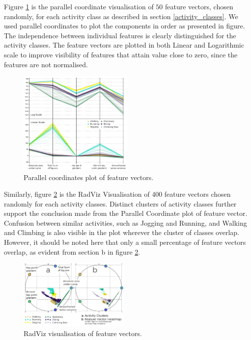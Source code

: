 \documentclass[5p]{elsarticle}
\begin{document}
Figure \ref{parallel_plot} is the parallel coordinate visualisation \cite{Wegman1990} of $50$ feature vectors, chosen randomly, for each activity class as described in section \ref{activity_classes}. We used parallel coordinates to plot the components in order as presented in figure. The independence between individual features is clearly distinguished for the activity classes. The feature vectors are plotted in both Linear and Logarithmic scale to improve visibility of features that attain value close to zero, since the features are not normalised.

\begin{figure}[h!]
  \begin{center}
    \includegraphics[width=0.5\textwidth]{ParallelPlot}
  \end{center}
  \vspace{-10pt}
  \caption{\label{parallel_plot}Parallel coordinates plot of feature vectors.}
  \vspace{5pt}
\end{figure}


Similarly, figure \ref{radviz_plot} is the RadViz Visualisation \cite{Sharko2008}\cite{Bertini2005} of 400 feature vectors chosen randomly for each activity classes. Distinct clusters of activity classes further support the conclusion made from the Parallel Coordinate plot of feature vector. Confusion between similar activities, such as Jogging and Running, and Walking and Climbing is also visible in the plot wherever the cluster of classes overlap. However, it should be noted here that only a small percentage of feature vectors overlap, as evident from section b in figure \ref{radviz_plot}.

\begin{figure}[h!]
  \begin{center}
    \includegraphics[width=0.48\textwidth]{RadViz}
  \end{center}
  \vspace{-10pt}
  \caption{\label{radviz_plot}RadViz visualisation of feature vectors.}
  \vspace{-10pt}
\end{figure}
\end{document}
